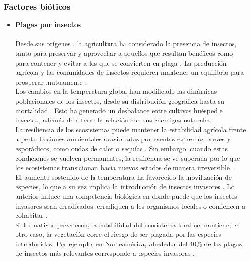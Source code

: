 \subsubsection{Factores bióticos}
\begin{itemize}[leftmargin=0cm, itemsep=0.5 cm]
	\item[]\textbf{Plagas por insectos\\}\\
	{Desde sus orígenes \cite{Mueller_2005}, la agricultura ha considerado la presencia de insectos, tanto para preservar y aprovechar a aquellos que resultan benéficos como para contener y evitar a los que se convierten en plaga \cite{Grogan_2014, Jones_2018}. La producción agrícola y las comunidades de insectos requieren mantener un equilibrio para prosperar mutuamente \cite{Mueller_2005}.\\ 
		
	Los cambios en la temperatura global han modificado las dinámicas poblacionales de los insectos, desde su distribución geográfica hasta su mortalidad \cite{Kiritani_2013}. Esto ha generado un desbalance entre cultivos huésped e insectos, además de alterar la relación con sus enemigos naturales \cite{Stange_2010, Thomson_2010}.\\
	
	La resiliencia de los ecosistemas puede mantener la estabilidad agrícola frente a perturbaciones ambientales ocasionadas por eventos extremos breves y esporádicos, como ondas de calor o sequías \cite{Asmamaw_2015}. Sin embargo, cuando estas condiciones se vuelven permanentes, la resiliencia se ve superada por lo que los ecosistemas transicionan hacia nuevos estados de manera irreversible \cite{Folke_2004}.\\
	
	El aumento sostenido de la temperatura ha favorecido la movilización de especies, lo que a su vez implica la introducción de insectos invasores \cite{Zhang_2025}. Lo anterior induce una competencia biológica en donde puede que los insectos invasores sean erradicados, erradiquen a los organismos locales o comiencen a cohabitar \cite{Ward_2007}.\\
	
	Si los nativos prevalecen, la estabilidad del ecosistema local se mantiene; en otro caso, la vegetación corre el riesgo de ser plagada por las especies introducidas. Por ejemplo, en Norteamérica, alrededor del 40\% de las plagas de insectos más relevantes corresponde a especies invasoras \cite{Niemela_1996}.\\
	
}
\end{itemize}
